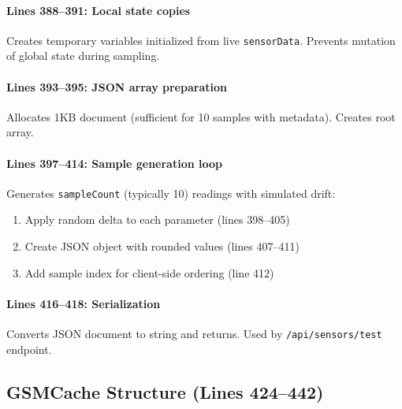 \documentclass[11pt,a4paper]{article}
\begin{document}
\paragraph{Lines 388--391: Local state copies}
Creates temporary variables initialized from live \texttt{sensorData}. Prevents mutation of global state during sampling.

\paragraph{Lines 393--395: JSON array preparation}
Allocates 1KB document (sufficient for 10 samples with metadata). Creates root array.

\paragraph{Lines 397--414: Sample generation loop}
Generates \texttt{sampleCount} (typically 10) readings with simulated drift:
\begin{enumerate}[leftmargin=*]
  \item Apply random delta to each parameter (lines 398--405)
  \item Create JSON object with rounded values (lines 407--411)
  \item Add sample index for client-side ordering (line 412)
\end{enumerate}

\paragraph{Lines 416--418: Serialization}
Converts JSON document to string and returns. Used by \texttt{/api/sensors/test} endpoint.

\subsection{GSMCache Structure (Lines 424--442)}
\end{document}
